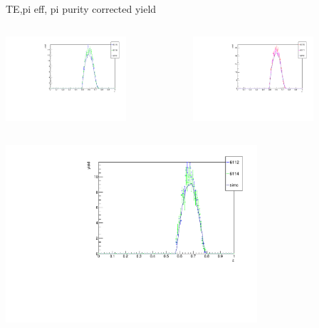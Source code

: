 \begin{frame}{TE,pi eff, pi purity corrected yield}
\begin{columns}
\begin{column}[T]{0.5\textwidth}
\includegraphics[width = 0.7\textwidth]{results/yield/check/yieldcheck_120_neg.pdf}
\end{column}
\begin{column}[T]{0.5\textwidth}
\includegraphics[width = 0.7\textwidth]{results/yield/check/yieldcheck_120_pos.pdf}
\end{column}
\end{columns}
\begin{columns}
\begin{column}[T]{0.5\textwidth}
\includegraphics[width = 0.7\textwidth]{results/yield/check/yieldcheck_110_neg.pdf}

\end{column}
\end{columns}
\end{frame}
